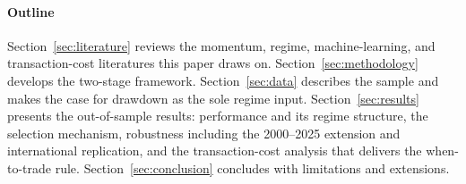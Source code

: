 \paragraph{Outline} Section~\ref{sec:literature} reviews the momentum, regime, machine-learning, and transaction-cost literatures this paper draws on. Section~\ref{sec:methodology} develops the two-stage framework. Section~\ref{sec:data} describes the sample and makes the case for drawdown as the sole regime input. Section~\ref{sec:results} presents the out-of-sample results: performance and its regime structure, the selection mechanism, robustness including the 2000--2025 extension and international replication, and the transaction-cost analysis that delivers the when-to-trade rule. Section~\ref{sec:conclusion} concludes with limitations and extensions.

